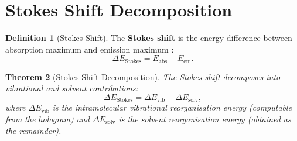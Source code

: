 \documentclass[11pt,a4paper]{article}
\newtheorem{theorem}{Theorem}[section]
\theoremstyle{definition}
\newtheorem{definition}[theorem]{Definition}
\theoremstyle{remark}
\begin{document}
\section{Stokes Shift Decomposition}
\label{sec:stokes}

\begin{definition}[Stokes Shift]
\label{def:stokes}
The \textbf{Stokes shift} is the energy difference between absorption maximum and emission maximum \citep{stokes1852}:
\begin{equation}
\Delta E_{\mathrm{Stokes}} = E_{\mathrm{abs}} - E_{\mathrm{em}}.
\end{equation}
\end{definition}

\begin{theorem}[Stokes Shift Decomposition]
\label{thm:stokes_decomp}
The Stokes shift decomposes into vibrational and solvent contributions:
\begin{equation}
\Delta E_{\mathrm{Stokes}} = \Delta E_{\mathrm{vib}} + \Delta E_{\mathrm{solv}},
\end{equation}
where $\Delta E_{\mathrm{vib}}$ is the intramolecular vibrational reorganisation energy (computable from the hologram) and $\Delta E_{\mathrm{solv}}$ is the solvent reorganisation energy (obtained as the remainder).
\end{theorem}
\end{document}
